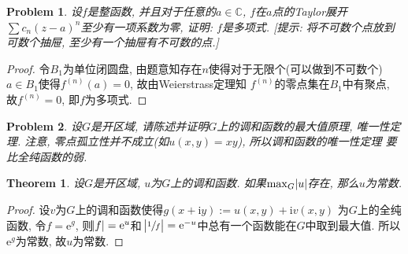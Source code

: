 \documentclass[a4paper, 12pt]{ctexart}
\title{\TITLE}
\author{\AUTHOR}
\date{\today}
\newtheorem{theorem}{Theorem}[section]
\theoremstyle{plain}
\newtheorem{problem}{Problem}[section]
\theoremstyle{plain}
\theoremstyle{plain}
\theoremstyle{nonumberplain}
\newtheorem{proof}{Proof}
\newcommand*{\BC}{\mathbb{C}}
\newcommand*{\me}{\mathrm{e}}
\newcommand*{\mi}{\mathrm{i}}
\begin{document}

    \maketitle
    \thispagestyle{empty}





    \newpage
    \pagestyle{fancy}
    \linenumbers

    \begin{problem}
        设$f$是整函数, 并且对于任意的$a\in\BC$, $f$在$a$点的Taylor展开
        $\sum{c_{n}(z-a)^{n}}$至少有一项系数为零, 证明: $f$是多项式.
        [提示: 将不可数个点放到可数个抽屉, 至少有一个抽屉有不可数的点.]
    \end{problem}

    \begin{proof}
        令$B_{1}$为单位闭圆盘, 由题意知存在$n$使得对于无限个(可以做到不可数个)
        $a\in B_{1}$使得$f^{(n)}(a)=0$, 故由Weierstrass定理知
        $f^{(n)}$的零点集在$B_{1}$中有聚点, 故$f^{(n)}=0$, 即$f$为多项式.
    \end{proof}

    \begin{problem}
        设$G$是开区域, 请陈述并证明$G$上的调和函数的最大值原理, 唯一性定理.
        注意, 零点孤立性并不成立(如$u(x,y)=xy$), 所以调和函数的唯一性定理
        要比全纯函数的弱.
    \end{problem}

    \begin{theorem}
        设$G$是开区域, $u$为$G$上的调和函数. 如果$\max_{G}{\abs{u}}$存在,
        那么$u$为常数.
    \end{theorem}

    \begin{proof}
        设$v$为$G$上的调和函数使得$g(x+\mi y):=u(x,y)+\mi v(x,y)$
        为$G$上的全纯函数,
        令$f=\me^{g}$, 则$\abs{f}=\me^{u}$和
        $\abs{\sfrac{1}{f}}=\me^{-u}$中总有一个函数能在$G$中取到最大值.
        所以$\me^{g}$为常数, 故$u$为常数.
    \end{proof}
\end{document}
